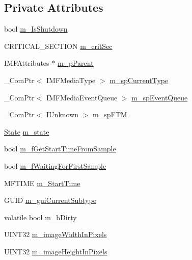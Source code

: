 \subsection*{Private Attributes}
\begin{DoxyCompactItemize}
\item 
bool \hyperlink{class_stream_sink_ad182fc0cfbeac87f05d7da5fc197383b}{m\+\_\+\+Is\+Shutdown}
\item 
C\+R\+I\+T\+I\+C\+A\+L\+\_\+\+S\+E\+C\+T\+I\+ON \hyperlink{class_stream_sink_a9f88414c2ae58b7b32f3457cee339076}{m\+\_\+crit\+Sec}
\item 
I\+M\+F\+Attributes $\ast$ \hyperlink{class_stream_sink_ae79bc84e4d1735da0e1b671eb3c09099}{m\+\_\+p\+Parent}
\item 
\+\_\+\+Com\+Ptr$<$ I\+M\+F\+Media\+Type $>$ \hyperlink{class_stream_sink_a5bda803616c3bdaf26146f53c3cff2f3}{m\+\_\+sp\+Current\+Type}
\item 
\+\_\+\+Com\+Ptr$<$ I\+M\+F\+Media\+Event\+Queue $>$ \hyperlink{class_stream_sink_a5df60ac76acb57ad9e1cfc91b71ee13b}{m\+\_\+sp\+Event\+Queue}
\item 
\+\_\+\+Com\+Ptr$<$ I\+Unknown $>$ \hyperlink{class_stream_sink_a678200461948ded6235ee7db32157f14}{m\+\_\+sp\+F\+TM}
\item 
\hyperlink{class_stream_sink_acc9030ca2dc258ca0fa57ce0b34b9ddd}{State} \hyperlink{class_stream_sink_a3bd92ea8f8b6d99790c51e638784499d}{m\+\_\+state}
\item 
bool \hyperlink{class_stream_sink_a8ecaf89901eff6bf7d13af18c4ae88cf}{m\+\_\+f\+Get\+Start\+Time\+From\+Sample}
\item 
bool \hyperlink{class_stream_sink_abd913c82f2e6f968966021e5dfbbd8a7}{m\+\_\+f\+Waiting\+For\+First\+Sample}
\item 
M\+F\+T\+I\+ME \hyperlink{class_stream_sink_ae81092995e38117c785f0d81f9018436}{m\+\_\+\+Start\+Time}
\item 
G\+U\+ID \hyperlink{class_stream_sink_a361e5f8e5ae2e4ef702bbdd593e45d2d}{m\+\_\+gui\+Current\+Subtype}
\item 
volatile bool \hyperlink{class_stream_sink_a7e2e688d30b5bebe1fa3d78b96184885}{m\+\_\+b\+Dirty}
\item 
U\+I\+N\+T32 \hyperlink{class_stream_sink_a1108fd9e673e84a45143c82efa074468}{m\+\_\+image\+Width\+In\+Pixels}
\item 
U\+I\+N\+T32 \hyperlink{class_stream_sink_abe44162bd1ea77ad92105672309d411c}{m\+\_\+image\+Height\+In\+Pixels}
\end{DoxyCompactItemize}


